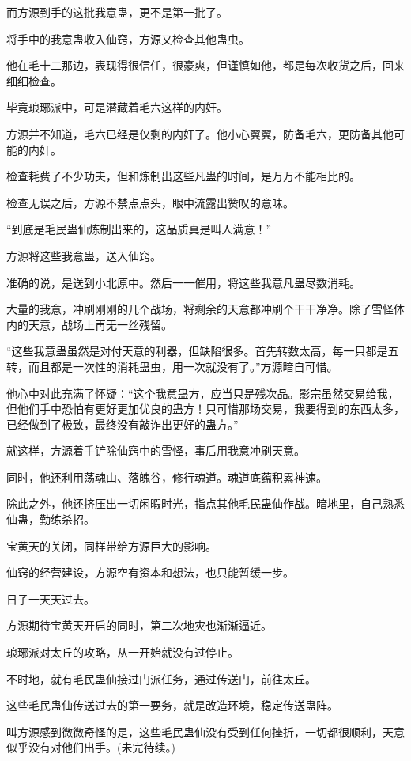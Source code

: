 \begin{this_body}
而方源到手的这批我意蛊，更不是第一批了。

将手中的我意蛊收入仙窍，方源又检查其他蛊虫。

他在毛十二那边，表现得很信任，很豪爽，但谨慎如他，都是每次收货之后，回来细细检查。

毕竟琅琊派中，可是潜藏着毛六这样的内奸。

方源并不知道，毛六已经是仅剩的内奸了。他小心翼翼，防备毛六，更防备其他可能的内奸。

检查耗费了不少功夫，但和炼制出这些凡蛊的时间，是万万不能相比的。

检查无误之后，方源不禁点点头，眼中流露出赞叹的意味。

“到底是毛民蛊仙炼制出来的，这品质真是叫人满意！”

方源将这些我意蛊，送入仙窍。

准确的说，是送到小北原中。然后一一催用，将这些我意凡蛊尽数消耗。

大量的我意，冲刷刚刚的几个战场，将剩余的天意都冲刷个干干净净。除了雪怪体内的天意，战场上再无一丝残留。

“这些我意蛊虽然是对付天意的利器，但缺陷很多。首先转数太高，每一只都是五转，而且都是一次性的消耗蛊虫，用一次就没有了。”方源暗自可惜。

他心中对此充满了怀疑：“这个我意蛊方，应当只是残次品。影宗虽然交易给我，但他们手中恐怕有更好更加优良的蛊方！只可惜那场交易，我要得到的东西太多，已经做到了极致，最终没有敲诈出更好的蛊方。”

就这样，方源着手铲除仙窍中的雪怪，事后用我意冲刷天意。

同时，他还利用荡魂山、落魄谷，修行魂道。魂道底蕴积累神速。

除此之外，他还挤压出一切闲暇时光，指点其他毛民蛊仙作战。暗地里，自己熟悉仙蛊，勤练杀招。

宝黄天的关闭，同样带给方源巨大的影响。

仙窍的经营建设，方源空有资本和想法，也只能暂缓一步。

日子一天天过去。

方源期待宝黄天开启的同时，第二次地灾也渐渐逼近。

琅琊派对太丘的攻略，从一开始就没有过停止。

不时地，就有毛民蛊仙接过门派任务，通过传送门，前往太丘。

这些毛民蛊仙传送过去的第一要务，就是改造环境，稳定传送蛊阵。

叫方源感到微微奇怪的是，这些毛民蛊仙没有受到任何挫折，一切都很顺利，天意似乎没有对他们出手。(未完待续。)

\end{this_body}

